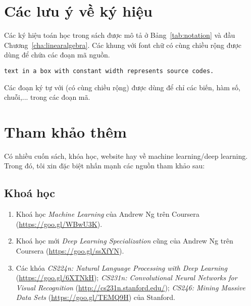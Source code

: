 \section{Các lưu ý về ký hiệu}
Các ký hiệu toán học trong sách được mô tả ở Bảng~\ref{tab:notation} và đầu
Chương~\ref{cha:linearalgebra}.
Các khung với font chữ có cùng chiều rộng được dùng để chứa các đoạn mã nguồn.
\begin{lstlisting}
text in a box with constant width represents source codes.
\end{lstlisting}
Các đoạn ký tự với  (có cùng chiều rộng)
được dùng để chỉ các biến, hàm số, chuỗi,...  trong các đoạn mã.


\section{Tham khảo thêm}

Có nhiều cuốn sách, khóa học, website hay về machine learning/deep learning. Trong đó, tôi xin đặc biệt nhấn mạnh các nguồn tham khảo sau:

\subsection{Khoá học}
\begin{enumerate}
  \item Khoá học \textit{Machine Learning} của Andrew Ng trên Coursera
  (\url{https://goo.gl/WBwU3K}).

  \item Khoá học mới \textit{Deep Learning Specialization} cũng của Andrew Ng
  trên Coursera (\url{https://goo.gl/ssXfYN}).

  \item Các khóa \textit{CS224n: Natural Language Processing with Deep
  Learning} (\url{https://goo.gl/6XTNkH}); \textit{CS231n: Convolutional Neural
  Networks for Visual Recognition} (\url{http://cs231n.stanford.edu/});
  \textit{CS246: Mining Massive Data Sets} (\url{https://goo.gl/TEMQ9H}) của
  Stanford.


\end{enumerate}

